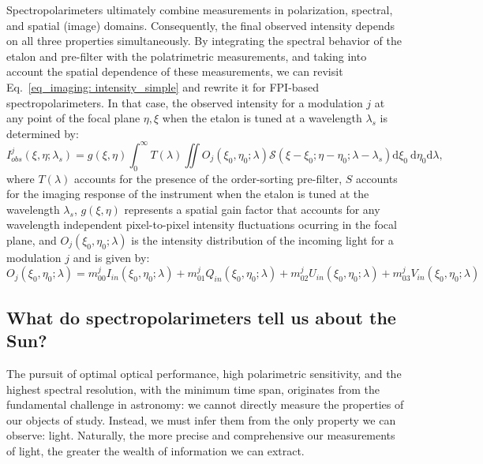 Spectropolarimeters ultimately combine measurements in polarization, spectral, and spatial (image) domains. Consequently, the final observed intensity depends on all three properties simultaneously. By integrating the spectral behavior of the etalon and pre-filter with the polatrimetric measurements, and taking into account the spatial dependence of these measurements, we can revisit Eq.~\eqref{eq_imaging: intensity_simple} and rewrite it for FPI-based spectropolarimeters. In that case, the observed intensity for a modulation $j$ at any point of the focal plane $\eta, \xi$ when the etalon is tuned at a wavelength $\lambda _ s$ is determined by:
\begin{equation}
  I_{obs}^j\left(\xi, \eta ; \lambda_{s}\right)=g(\xi, \eta)\int_{0}^{\infty} T(\lambda) \iint  O _ j\left(\xi_0, \eta_0 ; \lambda\right)  \mathcal{S}\left(\xi-\xi_0; \eta-\eta_0; \lambda - \lambda_s\right)  \mathrm{d} \xi_{0} \mathrm{~d} \eta_{0}\mathrm{d} \lambda ,
  \label{eq_spectro: General_Intensity}
\end{equation}
where $T(\lambda)$ accounts for the presence of the order-sorting pre-filter, $S$ accounts for the imaging response of the instrument when the etalon is tuned at the wavelength $\lambda_{s}$, $g(\xi, \eta)$ represents a spatial gain factor that accounts for any wavelength independent pixel-to-pixel intensity fluctuations ocurring in the focal plane, and $O _ j(\xi_0, \eta_ 0;\lambda)$ is the intensity distribution of the incoming light for a modulation $j$ and is given by:
\begin{equation}
  O _ j(\xi_0, \eta_ 0;\lambda) = m_{00} ^jI_{in}(\xi_0, \eta_ 0;\lambda) + m_{01}^jQ_{in}(\xi_0, \eta_ 0;\lambda) + m_{02}^jU_{in}(\xi_0, \eta_ 0;\lambda) + m_{03}^jV_{in}(\xi_0, \eta_ 0;\lambda)
\end{equation}
 
\subsection{What do spectropolarimeters tell us about the Sun?}

The pursuit of optimal optical performance, high polarimetric sensitivity, and the highest spectral resolution, with the minimum time span, originates from the fundamental challenge in astronomy: we cannot directly measure the properties of our objects of study. Instead, we must infer them from the only property we can observe: light. Naturally, the more precise and comprehensive our measurements of light, the greater the wealth of information we can extract. 

